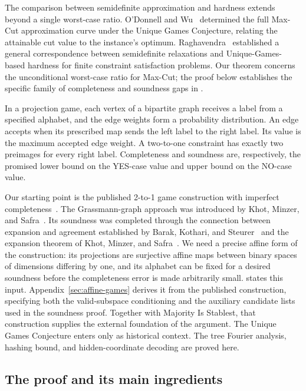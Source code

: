 The comparison between semidefinite approximation and hardness extends
beyond a single worst-case ratio. O'Donnell and Wu~\cite{OW08}
determined the full Max-Cut approximation curve under the Unique Games
Conjecture, relating the attainable cut value to the instance's optimum.
Raghavendra~\cite{Raghavendra08} established a general correspondence
between semidefinite relaxations and Unique-Games-based hardness for
finite constraint satisfaction problems. Our theorem concerns the
unconditional worst-case ratio for Max-Cut; the proof below establishes
the specific family of completeness and soundness gaps in
.

In a projection game, each vertex of a bipartite graph receives a label
from a specified alphabet, and the edge weights form a probability
distribution. An edge accepts when its prescribed map sends the left label to the
right label. Its value is the maximum accepted edge weight. A two-to-one
constraint has exactly two preimages for every right label. Completeness
and soundness are, respectively, the promised lower bound on the YES-case
value and upper bound on the NO-case value.

Our starting point is the published 2-to-1 game construction with imperfect
completeness~\cite{DKKMS25}. The Grassmann-graph approach was introduced
by Khot, Minzer, and Safra~\cite{KMS25}. Its soundness was completed
through the connection between expansion and agreement established by
Barak, Kothari, and Steurer~\cite{BKS19} and the expansion theorem of
Khot, Minzer, and Safra~\cite{KMS23}. We need a precise affine form of the
construction: its projections are surjective affine maps between binary
spaces of dimensions differing by one, and its alphabet can be fixed for a
desired soundness before the completeness error is made arbitrarily small.
 states this input. Appendix~\ref{sec:affine-games}
derives it from the published construction, specifying both the
valid-subspace conditioning and the auxiliary candidate lists used in
the soundness proof.
Together with Majority Is Stablest, that construction supplies the
external foundation of the argument. The Unique Games Conjecture enters
only as historical context. The tree Fourier analysis, hashing bound,
and hidden-coordinate decoding are proved here.

\subsection*{The proof and its main ingredients}

